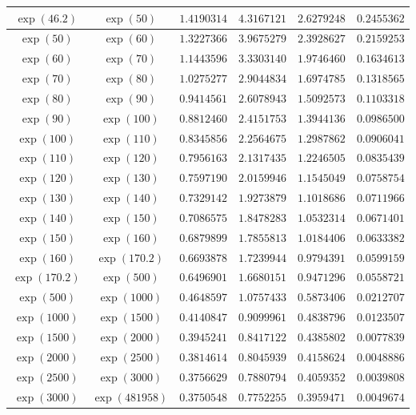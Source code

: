 \documentclass[reqno]{amsart}
\numberwithin{equation}{section}
\theoremstyle{remark}
\begin{document}
\begin{table}[h]
\begin{tabular}{|c|c|c|c|c|c|}
\hline
$\exp(46.2)$ & $\exp(50)$ & $1.4190314$ & $4.3167121 $ & $2.6279248 $ & $0.2455362$ \\
\hline
$\exp(50)$ & $\exp(60)$ & $1.3227366 $ & $3.9675279 $ & $2.3928627$& $0.2159253$ \\
\hline
$\exp(60)$ & $\exp(70)$ & $1.1443596 $ & $3.3303140 $ & $1.9746460$& $0.1634613$ \\
\hline
$\exp(70)$ & $\exp(80)$ & $1.0275277$ & $2.9044834$ & $1.6974785$& $0.1318565$ \\
\hline
$\exp(80)$ & $\exp(90)$ & $0.9414561$ & $2.6078943 $ & $1.5092573 $& $0.1103318$\\
\hline
$\exp(90)$ & $\exp(100)$ & $0.8812460$ & $2.4151753$ & $1.3944136 $& $0.0986500$ \\
\hline
$\exp(100)$ & $\exp(110)$ & $0.8345856 $ & $2.2564675$ & $1.2987862 $& $0.0906041$ \\
\hline
$\exp(110)$ & $\exp(120)$ & $0.7956163 $ & $ 2.1317435$ & $1.2246505 $& $0.0835439$ \\
\hline
$\exp(120)$ & $\exp(130)$ & $0.7597190 $ & $2.0159946$ & $1.1545049 $& $0.0758754$\\
\hline
$\exp(130)$ & $\exp(140)$ & $0.7329142$ & $1.9273879$ & $1.1018686$ & $0.0711966$\\
\hline
$\exp(140)$ & $\exp(150)$ & $0.7086575$ & $1.8478283$ & $1.0532314$ & $0.0671401$\\
\hline
$\exp(150)$ & $\exp(160)$ & $0.6879899$ & $1.7855813$ & $1.0184406$ & $0.0633382$\\
\hline
$\exp(160)$ & $\exp(170.2)$ & $0.6693878$ & $1.7239944$ & $0.9794391$ & $0.0599159$\\
\hline
$\exp(170.2)$ & $\exp(500)$ & $0.6496901 $ & $1.6680151 $ & $0.9471296$ & $0.0558721$\\
\hline
$\exp(500)$ & $\exp(1000)$ & $0.4648597$ & $1.0757433 $ & $0.5873406 $ & $0.0212707 $\\
\hline
$\exp(1000)$ & $\exp(1500)$ & $0.4140847 $ & $0.9099961 $ & $0.4838796$ & $0.0123507$\\
\hline
$\exp(1500)$ & $\exp(2000)$ & $ 0.3945241$ & $0.8417122 $ & $0.4385802 $ & $0.0077839 $\\
\hline
$\exp(2000)$ & $\exp(2500)$ & $0.3814614$ & $0.8045939 $ & $0.4158624 $ & $0.0048886 $\\
\hline
$\exp(2500)$ & $\exp(3000)$ & $0.3756629$ & $0.7880794$ & $0.4059352$ & $0.0039808$\\
\hline
$\exp(3000)$ & $\exp(481958)$ & $0.3750548$ & $0.7752255$ & $0.3959471$ & $0.0049674 $\\
\hline
\end{tabular}
\label{uxvw}
\end{table}
\end{document}
